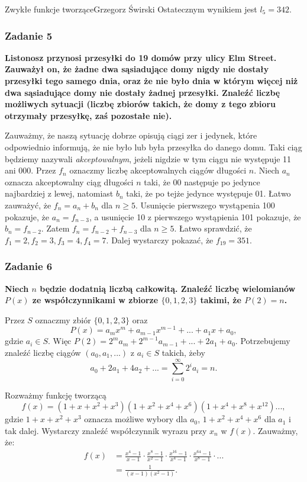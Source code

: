 \begin{referat}{Zwykłe funkcje tworzące}{Grzegorz Świrski}
Ostatecznym wynikiem jest $l_5 = 342.$

\subsubsection{Zadanie 5}
\textbf{Listonosz przynosi przesyłki do 19 domów przy ulicy Elm Street.
Zauważył on, że żadne dwa sąsiadujące domy nigdy nie dostały przesyłki tego
samego dnia, oraz że nie było dnia w którym więcej niż dwa sąsiadujące
domy nie dostały żadnej przesyłki. Znaleźć liczbę możliwych sytuacji
(liczbę zbiorów takich, że domy z tego zbioru otrzymały przesyłkę,
zaś pozostałe nie).}

Zauważmy, że naszą sytuację dobrze opisują ciągi zer i jedynek, które
odpowiednio informują, że nie było lub była przesyłka do danego domu. Taki
ciąg będziemy nazywali \textit{akceptowalnym}, jeżeli nigdzie w tym ciągu nie
występuje 11 ani 000. Przez $f_n$ oznaczmy liczbę akceptowalnych ciągów
długości $n$. Niech $a_n$ oznacza akceptowalny ciąg długości $n$ taki, że
00 następuje po jedynce najbardziej z lewej, natomiast $b_n$ taki, że po tejże
jedynce występuje 01. Łatwo zauważyć, że $f_n = a_n + b_n$ dla $n \geqslant 5$.
Usunięcie pierwszego wystąpenia 100 pokazuje, że $a_n = f_{n-3}$, a usunięcie
10 z pierwszego wystąpienia 101 pokazuje, że $b_n = f_{n-2}$. Zatem $f_n = f_{n-2} + f_{n-3}$
dla $n \geqslant 5$. Łatwo sprawdzić, że $f_1 = 2, f_2 = 3, f_3 = 4, f_4 = 7.$
Dalej wystarczy pokazać, że $f_{19} = 351$.

\subsubsection{Zadanie 6}
\textbf{Niech $n$ będzie dodatnią liczbą całkowitą. Znaleźć liczbę wielomianów
$P(x)$ ze współczynnikami w zbiorze $\{0,1,2,3\}$ takimi, że $P(2) = n$.}

Przez $S$ oznaczmy zbiór $\{0,1,2,3\}$ oraz
$$P(x) = a_m x^m + a_{m-1} x^{m-1} + ... + a_1x + a_0,$$
gdzie $a_i \in S$. Więc $P(2) = 2^m a_m + 2^{m-1} a_{m-1} + ... + 2a_1 + a_0$.
Potrzebujemy znaleźć liczbę ciągów $(a_0, a_1, ...)$ z $a_i \in S$ takich, żeby
$$a_0 + 2a_1 + 4a_2 + ... = \sum^\infty_{i=0} 2^ia_i = n.$$

Rozważmy funkcję tworzącą
$$f(x) = (1+x+x^2+x^3)(1+x^2+x^4+x^6)(1+x^4+x^8+x^12)...,$$
gdzie $1+x+x^2+x^3$ oznacza możliwe wybory dla $a_0$, $1+x^2+x^4+x^6$ dla
$a_1$ i tak dalej. Wystarczy znaleźć współczynnik wyrazu przy $x_n$ w $f(x)$.
Zauważmy, że:
\begin{align*}
  f(x) &= \frac{x^4 - 1}{x-1} \cdot \frac{x^8 - 1}{x^2-1} \cdot \frac{x^{16}-1}{x^4-1} 
  \cdot \frac{x^{64}-1}{x^8-1} \cdot... \\
       &= \frac{1}{(x-1)(x^2-1)}.
\end{align*}


\end{referat}
